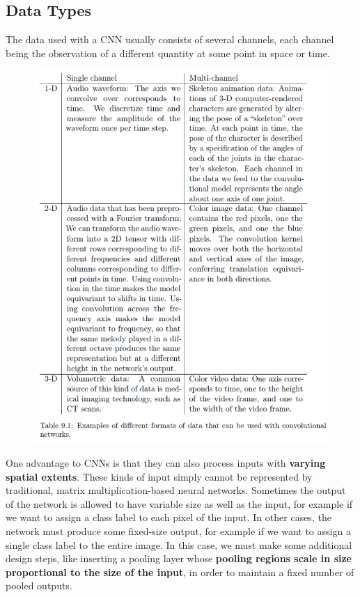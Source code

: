 \begin{multicols}{2}
	\subsection{Data Types}
	The data used with a CNN usually consists of several channels, each channel being the observation of a different quantity at some point in space or time.
	\begin{figure}[H]
		\centering
		\includegraphics[width=\linewidth]{images/datatypes.png}
	\end{figure}
	
	One advantage to CNNs is that they can also process inputs with \textbf{varying spatial extents}.
	These kinds of input simply cannot be represented by traditional, matrix multiplication-based neural networks.
	Sometimes the output of the network is allowed to have variable size as well as the input, for example if we want to assign a class label to each pixel of the input.
	In other cases, the network must produce some fixed-size output, for example if we want to assign a single class label to the entire image. In this case, we must make some additional design steps, like inserting a pooling layer whose \textbf{pooling regions scale in size proportional to the size of the input}, in order to maintain a fixed number of pooled outputs.
	\columnbreak

\end{multicols}
